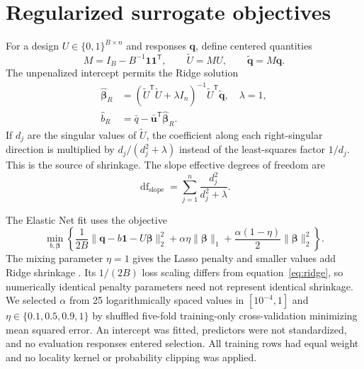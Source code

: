 \section{Regularized surrogate objectives}\label{app:regression}
For a design $U\in\{0,1\}^{B\times n}$ and responses $\boldsymbol q$, define centered quantities
\begin{equation}
M=I_B-B^{-1}\boldsymbol1\boldsymbol1^{\mathsf T},\qquad
\widetilde U=MU,\qquad \widetilde{\boldsymbol q}=M\boldsymbol q.
\end{equation}
The unpenalized intercept permits the Ridge solution
\begin{align}
\widehat{\boldsymbol\beta}_R&=
(\widetilde U^{\mathsf T}\widetilde U+\lambda I_n)^{-1}
\widetilde U^{\mathsf T}\widetilde{\boldsymbol q},\quad\lambda=1,\\
\widehat b_R&=\bar q-\bar{\boldsymbol u}^{\mathsf T}\widehat{\boldsymbol\beta}_R.
\end{align}
If $d_j$ are the singular values of $\widetilde U$, the coefficient along each right-singular direction is multiplied by $d_j/(d_j^2+\lambda)$ instead of the least-squares factor $1/d_j$. This is the source of shrinkage. The slope effective degrees of freedom are
\begin{equation}
\operatorname{df}_{\mathrm{slope}}=\sum_{j=1}^{n}\frac{d_j^2}{d_j^2+\lambda}.
\end{equation}

The Elastic Net fit uses the objective
\begin{equation}
\min_{b,\boldsymbol\beta}
\left\{\frac{1}{2B}\|\boldsymbol q-b\boldsymbol1-U\boldsymbol\beta\|_2^2
+\alpha\eta\|\boldsymbol\beta\|_1
+\frac{\alpha(1-\eta)}{2}\|\boldsymbol\beta\|_2^2\right\}.
\label{eq:enet}
\end{equation}
The mixing parameter $\eta=1$ gives the Lasso penalty \citep{tibshirani1996lasso} and smaller values add Ridge shrinkage \citep{zou2005elasticnet}. Its $1/(2B)$ loss scaling differs from equation~\eqref{eq:ridge}, so numerically identical penalty parameters need not represent identical shrinkage. We selected $\alpha$ from 25 logarithmically spaced values in $[10^{-4},1]$ and $\eta\in\{0.1,0.5,0.9,1\}$ by shuffled five-fold training-only cross-validation minimizing mean squared error. An intercept was fitted, predictors were not standardized, and no evaluation responses entered selection. All training rows had equal weight and no locality kernel or probability clipping was applied.

